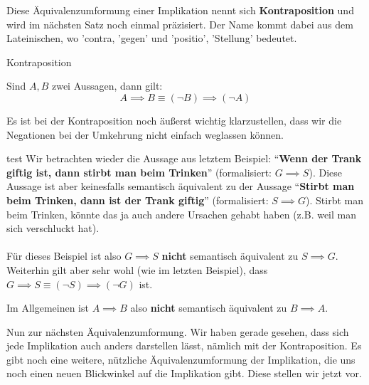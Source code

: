 \documentclass[../../main.tex]{subfiles}
\newcommand{\statement}[1]{\textrm{\enquote{\textbf{#1}}}}
\begin{document}
    Diese Äquivalenzumformung einer Implikation nennt sich \textbf{Kontraposition} 
    und wird im nächsten Satz noch einmal präzisiert.  Der Name kommt dabei aus dem Lateinischen, wo 'contra, 'gegen'
    und 'positio', 'Stellung' bedeutet. 
    
    \begin{lemma}{Kontraposition}

    Sind $A,B$ zwei Aussagen, dann gilt:
        \[A \implies B  \equiv (\lnot B) \implies (\lnot A)\]
    \end{lemma}

    Es ist bei der Kontraposition noch äußerst wichtig klarzustellen, dass wir die Negationen bei der Umkehrung
    nicht einfach weglassen können. 

    \begin{example}{test}
        Wir betrachten wieder die Aussage aus letztem Beispiel: \statement{Wenn der Trank giftig ist, 
        dann stirbt man beim Trinken} (formalisiert: $G \implies S$). Diese Aussage ist aber 
        keinesfalls semantisch äquivalent zu der 
        Aussage \statement{Stirbt man beim Trinken, dann ist der Trank giftig} (formalisiert: $S \implies G$).
        Stirbt man beim Trinken, könnte das ja auch andere Ursachen gehabt haben (z.B. weil man sich verschluckt hat).
        \\ \\
        Für dieses Beispiel ist also $G \implies S$ \textbf{nicht} semantisch äquivalent zu $S \implies G$.
        Weiterhin gilt aber sehr wohl (wie im letzten Beispiel), 
        dass $G \implies S \equiv (\lnot S) \implies (\lnot G)$ ist.

    \end{example}

    Im Allgemeinen ist $A \implies B$ also \textbf{nicht} semantisch äquivalent zu $B \implies A$.

    Nun zur nächsten Äquivalenzumformung. Wir haben gerade gesehen, dass sich jede Implikation auch anders darstellen lässt, nämlich mit der Kontraposition. Es gibt noch eine weitere, nützliche Äquivalenzumformung der Implikation, die uns noch einen neuen Blickwinkel auf die Implikation gibt. Diese stellen wir jetzt vor.
    
\end{document}
